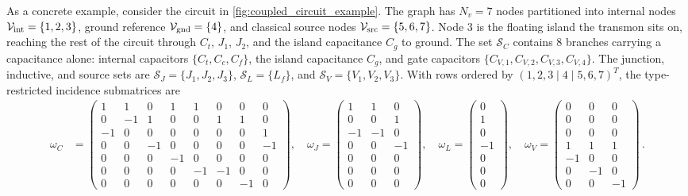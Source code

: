 \documentclass[10pt,aps,pra,onecolumn,superscriptaddress,floatfix,nofootinbib]{revtex4-2}
\begin{document}
As a concrete example, consider the circuit in \cref{fig:coupled_circuit_example}.
The graph has $N_v = 7$ nodes partitioned into internal nodes $\mathcal{V}_{\rm int} = \{1, 2, 3\}$, ground reference $\mathcal{V}_{\rm gnd} = \{4\}$, and classical source nodes $\mathcal{V}_{\rm src} = \{5, 6, 7\}$.
Node $3$ is the floating island the transmon sits on, reaching the rest of the circuit through $C_t$, $J_1$, $J_2$, and the island capacitance $C_g$ to ground.
The set $\mathcal{S}_C$ contains $8$ branches carrying a capacitance alone: internal capacitors $\{C_t, C_c, C_f\}$, the island capacitance $C_g$, and gate capacitors $\{C_{V,1}, C_{V,2}, C_{V,3}, C_{V,4}\}$.
The junction, inductive, and source sets are $\mathcal{S}_J = \{J_1, J_2, J_3\}$, $\mathcal{S}_L = \{L_f\}$, and $\mathcal{S}_V = \{V_1, V_2, V_3\}$.
With rows ordered by $(1, 2, 3 \mid 4 \mid 5, 6, 7)^T$, the type-restricted incidence submatrices are
\begin{align}
    \omega_C &= \begin{pmatrix}
        1 & 1 & 0 & 1 & 1 & 0 & 0 & 0 \\
        0 & -1 & 1 & 0 & 0 & 1 & 1 & 0 \\
        -1 & 0 & 0 & 0 & 0 & 0 & 0 & 1 \\
        0 & 0 & -1 & 0 & 0 & 0 & 0 & -1 \\
        0 & 0 & 0 & -1 & 0 & 0 & 0 & 0 \\
        0 & 0 & 0 & 0 & -1 & -1 & 0 & 0 \\
        0 & 0 & 0 & 0 & 0 & 0 & -1 & 0
    \end{pmatrix}, \quad
    \omega_J = \begin{pmatrix}
        1 & 1 & 0 \\
        0 & 0 & 1 \\
        -1 & -1 & 0 \\
        0 & 0 & -1 \\
        0 & 0 & 0 \\
        0 & 0 & 0 \\
        0 & 0 & 0
    \end{pmatrix}, \quad
    \omega_L = \begin{pmatrix}
        0 \\ 1 \\ 0 \\ -1 \\ 0 \\ 0 \\ 0
    \end{pmatrix}, \quad 
    \omega_V = \begin{pmatrix}
        0 & 0 & 0 \\
        0 & 0 & 0 \\
        0 & 0 & 0 \\
        1 & 1 & 1 \\
        -1 & 0 & 0 \\
        0 & -1 & 0 \\
        0 & 0 & -1
    \end{pmatrix} \, .
    \label{eq:example_omega_sub}
\end{align}
\end{document}

